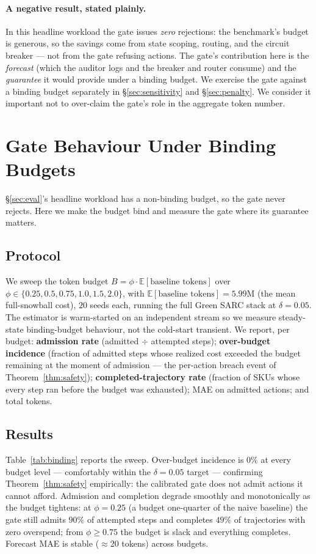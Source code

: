 \documentclass[11pt]{article}
\theoremstyle{plain}
\theoremstyle{definition}
\theoremstyle{remark}
\begin{document}
\paragraph{A negative result, stated plainly.} In this headline workload the gate issues \emph{zero} rejections: the benchmark's budget is generous, so the savings come from state scoping, routing, and the circuit breaker --- not from the gate refusing actions. The gate's contribution here is the \emph{forecast} (which the auditor logs and the breaker and router consume) and the \emph{guarantee} it would provide under a binding budget. We exercise the gate against a binding budget separately in \S\ref{sec:sensitivity} and \S\ref{sec:penalty}. We consider it important not to over-claim the gate's role in the aggregate token number.

\section{Gate Behaviour Under Binding Budgets}\label{sec:binding}

\S\ref{sec:eval}'s headline workload has a non-binding budget, so the gate never rejects. Here we make the budget bind and measure the gate where its guarantee matters.

\subsection{Protocol}
We sweep the token budget $B = \phi\cdot\mathbb{E}[\text{baseline tokens}]$ over $\phi\in\{0.25,0.5,0.75,1.0,1.5,2.0\}$, with $\mathbb{E}[\text{baseline tokens}]=5.99\text{M}$ (the mean full-snowball cost), $20$ seeds each, running the full Green SARC stack at $\delta=0.05$. The estimator is warm-started on an independent stream so we measure steady-state binding-budget behaviour, not the cold-start transient. We report, per budget: \textbf{admission rate} (admitted $\div$ attempted steps); \textbf{over-budget incidence} (fraction of admitted steps whose realized cost exceeded the budget remaining at the moment of admission --- the per-action breach event of Theorem~\ref{thm:safety}); \textbf{completed-trajectory rate} (fraction of SKUs whose every step ran before the budget was exhausted); MAE on admitted actions; and total tokens.

\subsection{Results}
Table~\ref{tab:binding} reports the sweep. Over-budget incidence is $0\%$ at every budget level --- comfortably within the $\delta=0.05$ target --- confirming Theorem~\ref{thm:safety} empirically: the calibrated gate does not admit actions it cannot afford. Admission and completion degrade smoothly and monotonically as the budget tightens: at $\phi=0.25$ (a budget one-quarter of the naive baseline) the gate still admits $90\%$ of attempted steps and completes $49\%$ of trajectories with zero overspend; from $\phi\ge0.75$ the budget is slack and everything completes. Forecast MAE is stable ($\approx 20$ tokens) across budgets.
\end{document}
